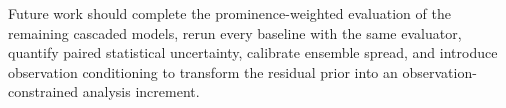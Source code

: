 \documentclass[11pt]{article}
\begin{document}
Future work should complete the prominence-weighted evaluation of the remaining cascaded models, rerun every baseline with the same evaluator, quantify paired statistical uncertainty, calibrate ensemble spread, and introduce observation conditioning to transform the residual prior into an observation-constrained analysis increment.



\end{document}
